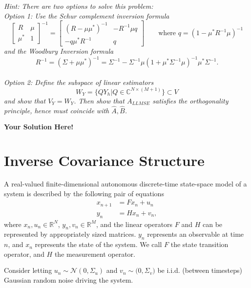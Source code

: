 \documentclass[12pt]{article}
\newcommand{\0}{\mathbf{0}}
\newcommand{\1}{\mathbf{1}}
\newcommand{\solspace}{\vspace{3mm} \textbf{Your Solution Here!} \vspace{3mm}}
\begin{document}
\textit{
    Hint: There are two options to solve this problem:\\
    Option 1: Use the Schur complement inversion formula
    \begin{equation}
        \begin{bmatrix}
            R & \mu \\
            \mu^* & 1
        \end{bmatrix}^{-1} = \begin{bmatrix}
            (R - \mu \mu^*)^{-1} & -R^{-1}\mu q \\
            -q \mu^* R^{-1} & q
        \end{bmatrix} \qquad \text{where } q = (1-\mu^*R^{-1}\mu)^{-1}
    \end{equation}
    and the Woodbury Inversion formula
    \begin{equation}
        R^{-1} = (\Sigma + \mu\mu^*)^{-1} = \Sigma^{-1} - \Sigma^{-1} \mu (1 + \mu^* \Sigma^{-1} \mu)^{-1} \mu^* \Sigma^{-1}.
    \end{equation}\\
    Option 2: Define the subspace of linear estimators
    \begin{equation}
        W_Y = \{Q Y_h | Q \in \mathbb{C}^{N \times (M+1)}\} \subset V
    \end{equation}
    and show that $V_Y = W_Y$. Then show that $A_{LLMSE}$ satisfies the orthogonality principle, hence must coincide with $\hat{A}, \hat{B}$.
}

\solspace

\pagebreak
\section{Inverse Covariance Structure}
A real-valued finite-dimensional autonomous discrete-time state-space model of a system is described by the following pair of equations
\begin{align}
    x_{n+1} &= F x_n + u_n \\
    y_n &= H x_n + v_n,
\end{align}
where $x_n, u_n \in \mathbb{R}^N$, $y_n, v_n \in \mathbb{R}^M$, and the linear operators $F$ and $H$ can be represented by appropriately sized matrices.
$y_n$ represents an observable at time $n$, and $x_n$ represents the state of the system.
We call $F$ the state transition operator, and $H$ the measurement operator.

Consider letting $u_n \sim \mathcal{N}(0,\Sigma_u)$ and $v_n \sim \mathcal(0,\Sigma_v)$ be i.i.d. (between timesteps) Gaussian random noise driving the system.
\end{document}
